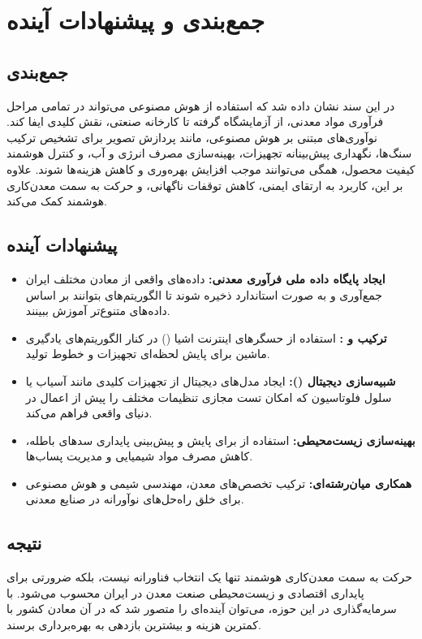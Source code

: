\chapter{جمع‌بندی و پیشنهادات آینده}

\section*{جمع‌بندی}
در این سند نشان داده شد که استفاده از هوش مصنوعی می‌تواند در تمامی مراحل فرآوری مواد معدنی، از آزمایشگاه گرفته تا کارخانه صنعتی، نقش کلیدی ایفا کند. 
نوآوری‌های مبتنی بر هوش مصنوعی، مانند پردازش تصویر برای تشخیص ترکیب سنگ‌ها، نگهداری پیش‌بینانه تجهیزات، بهینه‌سازی مصرف انرژی و آب، و کنترل هوشمند کیفیت محصول، همگی می‌توانند موجب افزایش بهره‌وری و کاهش هزینه‌ها شوند. 
علاوه بر این، کاربرد  به ارتقای ایمنی، کاهش توقفات ناگهانی، و حرکت به سمت معدن‌کاری هوشمند کمک می‌کند.

\section*{پیشنهادات آینده}
\begin{itemize}
  \item \textbf{ایجاد پایگاه داده ملی فرآوری معدنی:} 
  داده‌های واقعی از معادن مختلف ایران جمع‌آوری و به صورت استاندارد ذخیره شوند تا الگوریتم‌های  بتوانند بر اساس داده‌های متنوع‌تر آموزش ببینند.
  
  \item \textbf{ترکیب  و :} 
  استفاده از حسگرهای اینترنت اشیا () در کنار الگوریتم‌های یادگیری ماشین برای پایش لحظه‌ای تجهیزات و خطوط تولید.
  
  \item \textbf{شبیه‌سازی دیجیتال ():} 
  ایجاد مدل‌های دیجیتال از تجهیزات کلیدی مانند آسیاب یا سلول فلوتاسیون که امکان تست مجازی تنظیمات مختلف را پیش از اعمال در دنیای واقعی فراهم می‌کند.
  
  \item \textbf{بهینه‌سازی زیست‌محیطی:} 
  استفاده از  برای پایش و پیش‌بینی پایداری سدهای باطله، کاهش مصرف مواد شیمیایی و مدیریت پساب‌ها.
  
  \item \textbf{همکاری میان‌رشته‌ای:} 
  ترکیب تخصص‌های معدن، مهندسی شیمی و هوش مصنوعی برای خلق راه‌حل‌های نوآورانه در صنایع معدنی.
\end{itemize}

\section*{نتیجه}
حرکت به سمت معدن‌کاری هوشمند تنها یک انتخاب فناورانه نیست، بلکه ضرورتی برای پایداری اقتصادی و زیست‌محیطی صنعت معدن در ایران محسوب می‌شود. 
با سرمایه‌گذاری در این حوزه، می‌توان آینده‌ای را متصور شد که در آن معادن کشور با کمترین هزینه و بیشترین بازدهی به بهره‌برداری برسند.
